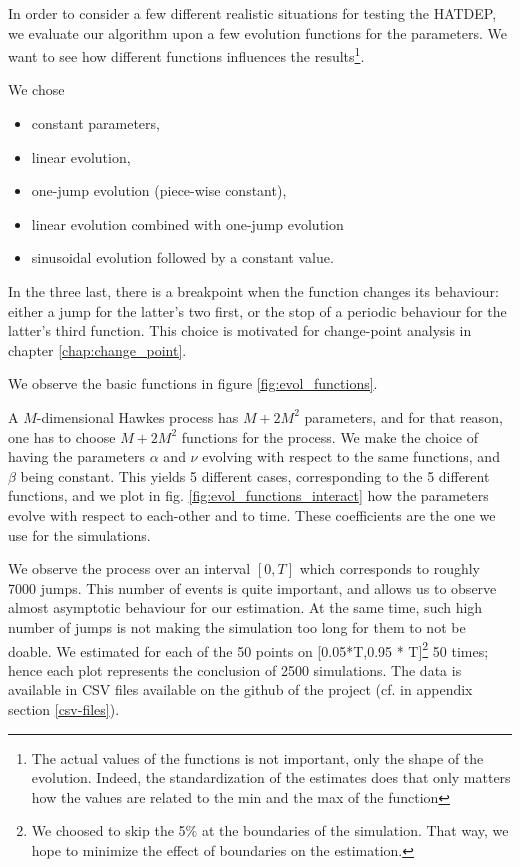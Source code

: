 In order to consider a few different realistic situations for testing the HATDEP, we evaluate our algorithm upon a few evolution functions for the parameters. We want to see how different functions influences the results\footnote{The actual values of the functions is not important, only the shape of the evolution. Indeed, the standardization of the estimates does that only matters how the values are related to the min and the max of the function}.

We chose 

\begin{itemize}
\item constant parameters, 
\item linear evolution, 
\item one-jump evolution (piece-wise constant), 
\item linear evolution combined with one-jump evolution 
\item sinusoidal evolution followed by a constant value.
\end{itemize}

In the three last, there is a breakpoint when the function changes its behaviour: either a jump for the latter's two first, or the stop of a periodic behaviour for the latter's third function. This choice is motivated for change-point analysis in 
chapter \ref{chap:change_point}. 

We observe the basic functions in figure \ref{fig:evol_functions}.

A $M$-dimensional Hawkes process has $M+2M^2$ parameters, and for that reason, one has to choose $M+2M^2$ functions for the process. We make the choice of having the parameters $\alpha$ and $\nu$ evolving with respect to the same functions, and $\beta$ being constant. This yields 5 different cases, corresponding to the 5 different functions, and we plot in fig. \ref{fig:evol_functions_interact} how the parameters evolve with respect to each-other and to time. These coefficients are the one we use for the simulations. 

We observe the process over an interval $[0,T]$ which corresponds to roughly 7000 jumps. This number of events is quite important, and allows us to observe almost asymptotic behaviour for our estimation. At the same time, such high number of jumps is not making the simulation too long for them to not be doable. We estimated for each of the 50 points on [0.05*T,0.95 * T]\footnote{We choosed to skip the 5$\%$ at the boundaries of the simulation. That way, we hope to minimize the effect of boundaries on the estimation.}  50 times; hence each plot represents the conclusion of 2500 simulations. The data is available in CSV files available on the github of the project (cf. in appendix section \ref{csv-files}).

